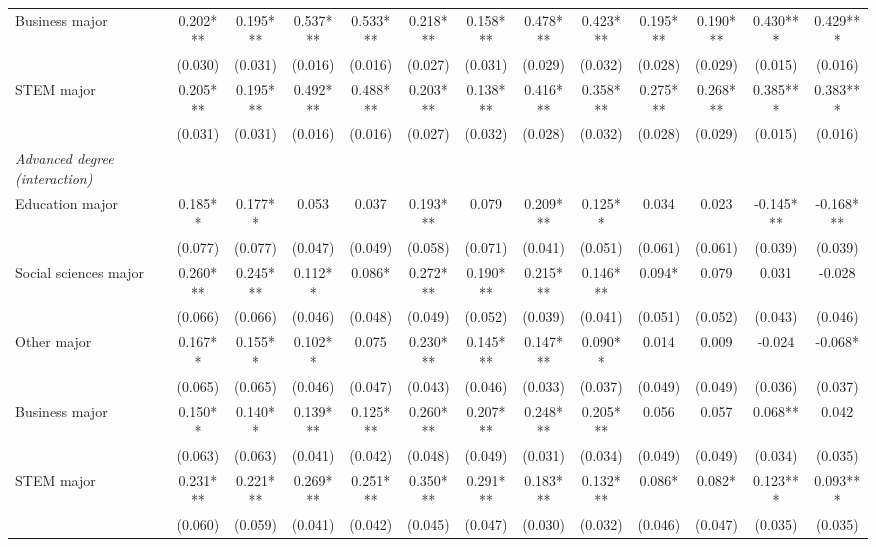 \begin{table}[ht]
{\begin{threeparttable}
\begin{tabular}{lcccccccccccc}
\qquad{}Business major & 0.202*** & 0.195*** & 0.537*** & 0.533*** & 0.218*** & 0.158*** & 0.478*** & 0.423*** & 0.195*** & 0.190*** & 0.430*** & 0.429***    \\
 & (0.030) & (0.031) & (0.016) & (0.016) & (0.027) & (0.031) & (0.029) & (0.032) & (0.028) & (0.029) & (0.015) & (0.016) \\
\qquad{}STEM major & 0.205*** & 0.195*** & 0.492*** & 0.488*** & 0.203*** & 0.138*** & 0.416*** & 0.358*** & 0.275*** & 0.268*** & 0.385*** & 0.383***    \\
 & (0.031) & (0.031) & (0.016) & (0.016) & (0.027) & (0.032) & (0.028) & (0.032) & (0.028) & (0.029) & (0.015) & (0.016) \\
\emph{Advanced degree (interaction)}             &              &              &              &              &              &              &              &              &              &              &              &             \\
\qquad{}Education major & 0.185** & 0.177** & 0.053 & 0.037 & 0.193*** & 0.079 & 0.209*** & 0.125** & 0.034 & 0.023 & -0.145*** & -0.168***    \\
 & (0.077) & (0.077) & (0.047) & (0.049) & (0.058) & (0.071) & (0.041) & (0.051) & (0.061) & (0.061) & (0.039) & (0.039) \\
\qquad{}Social sciences major & 0.260*** & 0.245*** & 0.112** & 0.086* & 0.272*** & 0.190*** & 0.215*** & 0.146*** & 0.094* & 0.079 & 0.031 & -0.028    \\
 & (0.066) & (0.066) & (0.046) & (0.048) & (0.049) & (0.052) & (0.039) & (0.041) & (0.051) & (0.052) & (0.043) & (0.046) \\
\qquad{}Other major & 0.167** & 0.155** & 0.102** & 0.075 & 0.230*** & 0.145*** & 0.147*** & 0.090** & 0.014 & 0.009 & -0.024 & -0.068*    \\
 & (0.065) & (0.065) & (0.046) & (0.047) & (0.043) & (0.046) & (0.033) & (0.037) & (0.049) & (0.049) & (0.036) & (0.037) \\
\qquad{}Business major & 0.150** & 0.140** & 0.139*** & 0.125*** & 0.260*** & 0.207*** & 0.248*** & 0.205*** & 0.056 & 0.057 & 0.068** & 0.042    \\
 & (0.063) & (0.063) & (0.041) & (0.042) & (0.048) & (0.049) & (0.031) & (0.034) & (0.049) & (0.049) & (0.034) & (0.035) \\
\qquad{}STEM major & 0.231*** & 0.221*** & 0.269*** & 0.251*** & 0.350*** & 0.291*** & 0.183*** & 0.132*** & 0.086* & 0.082* & 0.123*** & 0.093***    \\
 & (0.060) & (0.059) & (0.041) & (0.042) & (0.045) & (0.047) & (0.030) & (0.032) & (0.046) & (0.047) & (0.035) & (0.035) \\

\end{tabular}
\end{threeparttable}}
\end{table}
